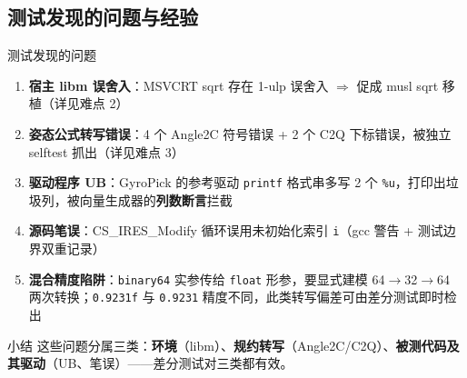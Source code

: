 \documentclass[UTF8,aspectratio=169]{ctexbeamer}
\begin{document}
\subsection{测试发现的问题与经验}
\begin{frame}{测试发现的问题}
  \begin{enumerate}\small
    \item \textbf{宿主 libm 误舍入}：MSVCRT sqrt 存在 1-ulp 误舍入 $\Rightarrow$ 促成 musl sqrt 移植（详见难点 2）
    \item \textbf{姿态公式转写错误}：4 个 Angle2C 符号错误 + 2 个 C2Q 下标错误，被独立 selftest 抓出（详见难点 3）
    \item \textbf{驱动程序 UB}：GyroPick 的参考驱动 \texttt{printf} 格式串多写 2 个 \texttt{\%u}，打印出垃圾列，被向量生成器的\textbf{列数断言}拦截
    \item \textbf{源码笔误}：CS\_IRES\_Modify 循环误用未初始化索引 \texttt{i}（gcc 警告 + 测试边界双重记录）
    \item \textbf{混合精度陷阱}：\texttt{binary64} 实参传给 \texttt{float} 形参，要显式建模 64$\to$32$\to$64 两次转换；\texttt{0.9231f} 与 \texttt{0.9231} 精度不同，此类转写偏差可由差分测试即时检出
  \end{enumerate}
  \vspace{0.5em}
  \begin{block}{小结}
    \small 这些问题分属三类：\textbf{环境}（libm）、\textbf{规约转写}（Angle2C/C2Q）、\textbf{被测代码及其驱动}（UB、笔误）——差分测试对三类都有效。
  \end{block}
\end{frame}
\end{document}
